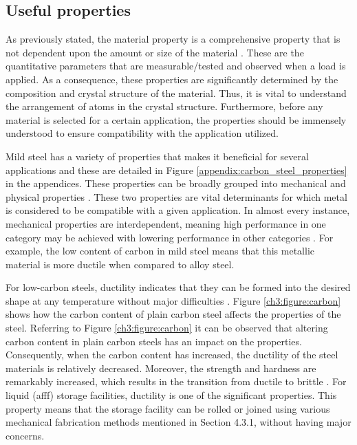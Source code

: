 \subsection{Useful properties} 
As previously stated, the material property is a comprehensive property that is not dependent upon the amount or size of the material \cite{kabir2020critical}. These are the quantitative parameters that are measurable/tested and observed when a load is applied. As a consequence, these properties are significantly determined by the composition and crystal structure of the material. Thus, it is vital to understand the arrangement of atoms in the crystal structure. Furthermore, before any material is selected for a certain application, the properties should be immensely understood to ensure compatibility with the application utilized.

Mild steel has a variety of properties that makes it beneficial for several applications and these are detailed in Figure \ref{appendix:carbon_steel_properties} in the appendices. These properties can be broadly grouped into mechanical and physical properties \cite{kabir2020critical}. These two properties are vital determinants for which metal is considered to be compatible with a given application. In almost every instance, mechanical properties are interdependent, meaning high performance in one category may be achieved with lowering performance in other categories \cite{kabir2020critical}. For example, the low content of carbon in mild steel means that this metallic material is more ductile when compared to alloy steel.

For low-carbon steels, ductility indicates that they can be formed into the desired shape at any temperature without major difficulties \cite{dong2005deformation}. Figure \ref{ch3:figure:carbon} shows how the carbon content of plain carbon steel affects the properties of the steel. Referring to Figure \ref{ch3:figure:carbon} it can be observed that altering carbon content in plain carbon steels has an impact on the properties. Consequently, when the carbon content has increased, the ductility of the steel materials is relatively decreased. Moreover, the strength and hardness are remarkably increased, which results in the transition from ductile to brittle \cite{abou2001mechanical}. For liquid (\acrshort{afff}) storage facilities, ductility is one of the significant properties. This property means that the storage facility can be rolled or joined using various mechanical fabrication methods mentioned in Section 4.3.1, without having major concerns.
 
